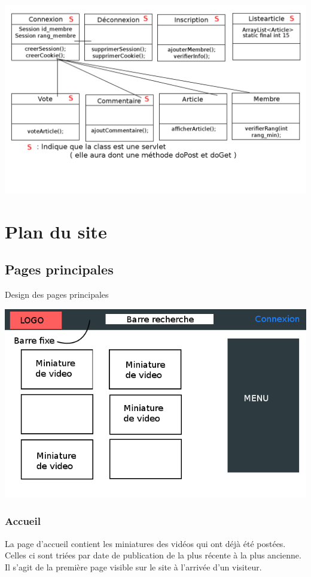 \documentclass{article}
\begin{document}
\includegraphics[scale=0.4, angle=90]{UML.png}


\section{Plan du site}

\subsection{Pages principales}
\begin{center}
Design des pages principales
\end{center}
\includegraphics[scale=0.7]{design.png}


\subsubsection{Accueil}
La page d'accueil contient les miniatures des vidéos qui ont déjà été postées. Celles ci sont triées par date de publication de la plus récente à la plus ancienne.
Il s'agit de la première page visible sur le site à l'arrivée d'un visiteur.
\end{document}
